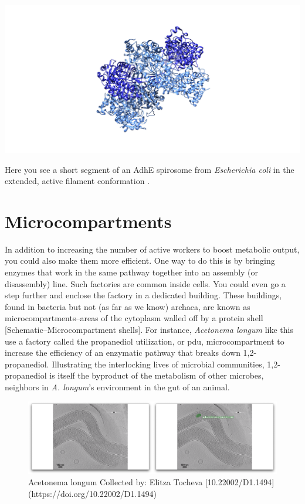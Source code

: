 \documentclass[]{tufte-book}
\begin{document}
\includegraphics{img/schematics/4_5_1}

Here you see a short segment of an AdhE spirosome from \emph{Escherichia
coli} in the extended, active filament conformation \citet{pony2020}.

\section{Microcompartments}\label{microcompartments}

In addition to increasing the number of active workers to boost
metabolic output, you could also make them more efficient. One way to do
this is by bringing enzymes that work in the same pathway together into
an assembly (or disassembly) line. Such factories are common inside
cells. You could even go a step further and enclose the factory in a
dedicated building. These buildings, found in bacteria but not (as far
as we know) archaea, are known as microcompartments--areas of the
cytoplasm walled off by a protein shell {[}Schematic--Microcompartment
shells{]}. For instance, \emph{Acetonema longum} like this use a factory
called the propanediol utilization, or pdu, microcompartment to increase
the efficiency of an enzymatic pathway that breaks down 1,2-propanediol.
Illustrating the interlocking lives of microbial communities,
1,2-propanediol is itself the byproduct of the metabolism of other
microbes, neighbors in \emph{A. longum}'s environment in the gut of an
animal.

\begin{figure}
\includegraphics{movie_stills/4_6} \caption[Acetonema longum Collected by]{Acetonema longum Collected by: Elitza Tocheva [10.22002/D1.1494](https://doi.org/10.22002/D1.1494)}\label{fig:unnamed-chunk-67}
\end{figure}
\end{document}

